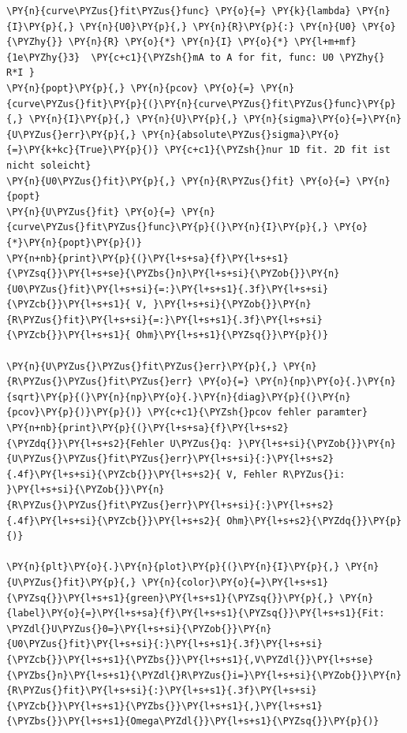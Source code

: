     \begin{tcolorbox}[breakable, size=fbox, boxrule=1pt, pad at break*=1mm,colback=cellbackground, colframe=cellborder]
\begin{Verbatim}[commandchars=\\\{\}]
\PY{n}{curve\PYZus{}fit\PYZus{}func} \PY{o}{=} \PY{k}{lambda} \PY{n}{I}\PY{p}{,} \PY{n}{U0}\PY{p}{,} \PY{n}{R}\PY{p}{:} \PY{n}{U0} \PY{o}{\PYZhy{}} \PY{n}{R} \PY{o}{*} \PY{n}{I} \PY{o}{*} \PY{l+m+mf}{1e\PYZhy{}3}  \PY{c+c1}{\PYZsh{}mA to A for fit, func: U0 \PYZhy{} R*I }
\PY{n}{popt}\PY{p}{,} \PY{n}{pcov} \PY{o}{=} \PY{n}{curve\PYZus{}fit}\PY{p}{(}\PY{n}{curve\PYZus{}fit\PYZus{}func}\PY{p}{,} \PY{n}{I}\PY{p}{,} \PY{n}{U}\PY{p}{,} \PY{n}{sigma}\PY{o}{=}\PY{n}{U\PYZus{}err}\PY{p}{,} \PY{n}{absolute\PYZus{}sigma}\PY{o}{=}\PY{k+kc}{True}\PY{p}{)} \PY{c+c1}{\PYZsh{}nur 1D fit. 2D fit ist nicht soleicht}
\PY{n}{U0\PYZus{}fit}\PY{p}{,} \PY{n}{R\PYZus{}fit} \PY{o}{=} \PY{n}{popt}
\PY{n}{U\PYZus{}fit} \PY{o}{=} \PY{n}{curve\PYZus{}fit\PYZus{}func}\PY{p}{(}\PY{n}{I}\PY{p}{,} \PY{o}{*}\PY{n}{popt}\PY{p}{)} 
\PY{n+nb}{print}\PY{p}{(}\PY{l+s+sa}{f}\PY{l+s+s1}{\PYZsq{}}\PY{l+s+se}{\PYZbs{}n}\PY{l+s+si}{\PYZob{}}\PY{n}{U0\PYZus{}fit}\PY{l+s+si}{=:}\PY{l+s+s1}{.3f}\PY{l+s+si}{\PYZcb{}}\PY{l+s+s1}{ V, }\PY{l+s+si}{\PYZob{}}\PY{n}{R\PYZus{}fit}\PY{l+s+si}{=:}\PY{l+s+s1}{.3f}\PY{l+s+si}{\PYZcb{}}\PY{l+s+s1}{ Ohm}\PY{l+s+s1}{\PYZsq{}}\PY{p}{)}

\PY{n}{U\PYZus{}\PYZus{}fit\PYZus{}err}\PY{p}{,} \PY{n}{R\PYZus{}\PYZus{}fit\PYZus{}err} \PY{o}{=} \PY{n}{np}\PY{o}{.}\PY{n}{sqrt}\PY{p}{(}\PY{n}{np}\PY{o}{.}\PY{n}{diag}\PY{p}{(}\PY{n}{pcov}\PY{p}{)}\PY{p}{)} \PY{c+c1}{\PYZsh{}pcov fehler paramter}
\PY{n+nb}{print}\PY{p}{(}\PY{l+s+sa}{f}\PY{l+s+s2}{\PYZdq{}}\PY{l+s+s2}{Fehler U\PYZus{}q: }\PY{l+s+si}{\PYZob{}}\PY{n}{U\PYZus{}\PYZus{}fit\PYZus{}err}\PY{l+s+si}{:}\PY{l+s+s2}{.4f}\PY{l+s+si}{\PYZcb{}}\PY{l+s+s2}{ V, Fehler R\PYZus{}i: }\PY{l+s+si}{\PYZob{}}\PY{n}{R\PYZus{}\PYZus{}fit\PYZus{}err}\PY{l+s+si}{:}\PY{l+s+s2}{.4f}\PY{l+s+si}{\PYZcb{}}\PY{l+s+s2}{ Ohm}\PY{l+s+s2}{\PYZdq{}}\PY{p}{)}

\PY{n}{plt}\PY{o}{.}\PY{n}{plot}\PY{p}{(}\PY{n}{I}\PY{p}{,} \PY{n}{U\PYZus{}fit}\PY{p}{,} \PY{n}{color}\PY{o}{=}\PY{l+s+s1}{\PYZsq{}}\PY{l+s+s1}{green}\PY{l+s+s1}{\PYZsq{}}\PY{p}{,} \PY{n}{label}\PY{o}{=}\PY{l+s+sa}{f}\PY{l+s+s1}{\PYZsq{}}\PY{l+s+s1}{Fit: \PYZdl{}U\PYZus{}0=}\PY{l+s+si}{\PYZob{}}\PY{n}{U0\PYZus{}fit}\PY{l+s+si}{:}\PY{l+s+s1}{.3f}\PY{l+s+si}{\PYZcb{}}\PY{l+s+s1}{\PYZbs{}}\PY{l+s+s1}{,V\PYZdl{}}\PY{l+s+se}{\PYZbs{}n}\PY{l+s+s1}{\PYZdl{}R\PYZus{}i=}\PY{l+s+si}{\PYZob{}}\PY{n}{R\PYZus{}fit}\PY{l+s+si}{:}\PY{l+s+s1}{.3f}\PY{l+s+si}{\PYZcb{}}\PY{l+s+s1}{\PYZbs{}}\PY{l+s+s1}{,}\PY{l+s+s1}{\PYZbs{}}\PY{l+s+s1}{Omega\PYZdl{}}\PY{l+s+s1}{\PYZsq{}}\PY{p}{)}


\end{Verbatim}
\end{tcolorbox}
